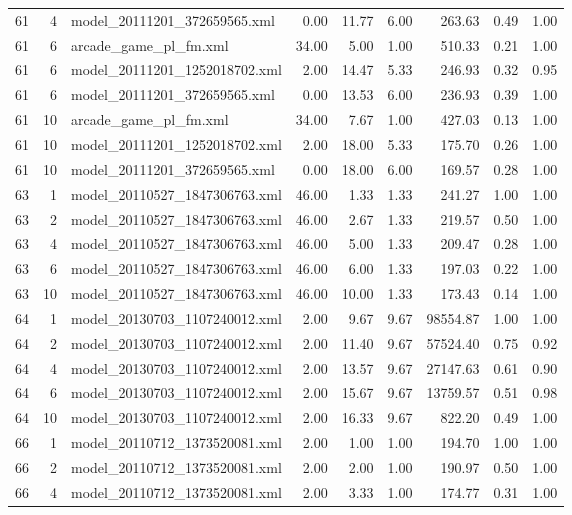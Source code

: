 \begin{table}[ht]
\begin{tabular}{rrlrrrrrr}
   61 &   4 & model\_20111201\_372659565.xml & 0.00 & 11.77 & 6.00 & 263.63 & 0.49 & 1.00 \\ 
   61 &   6 & arcade\_game\_pl\_fm.xml & 34.00 & 5.00 & 1.00 & 510.33 & 0.21 & 1.00 \\ 
   61 &   6 & model\_20111201\_1252018702.xml & 2.00 & 14.47 & 5.33 & 246.93 & 0.32 & 0.95 \\ 
   61 &   6 & model\_20111201\_372659565.xml & 0.00 & 13.53 & 6.00 & 236.93 & 0.39 & 1.00 \\ 
   61 &  10 & arcade\_game\_pl\_fm.xml & 34.00 & 7.67 & 1.00 & 427.03 & 0.13 & 1.00 \\ 
   61 &  10 & model\_20111201\_1252018702.xml & 2.00 & 18.00 & 5.33 & 175.70 & 0.26 & 1.00 \\ 
   61 &  10 & model\_20111201\_372659565.xml & 0.00 & 18.00 & 6.00 & 169.57 & 0.28 & 1.00 \\ 
   63 &   1 & model\_20110527\_1847306763.xml & 46.00 & 1.33 & 1.33 & 241.27 & 1.00 & 1.00 \\ 
   63 &   2 & model\_20110527\_1847306763.xml & 46.00 & 2.67 & 1.33 & 219.57 & 0.50 & 1.00 \\ 
   63 &   4 & model\_20110527\_1847306763.xml & 46.00 & 5.00 & 1.33 & 209.47 & 0.28 & 1.00 \\ 
   63 &   6 & model\_20110527\_1847306763.xml & 46.00 & 6.00 & 1.33 & 197.03 & 0.22 & 1.00 \\ 
   63 &  10 & model\_20110527\_1847306763.xml & 46.00 & 10.00 & 1.33 & 173.43 & 0.14 & 1.00 \\ 
   64 &   1 & model\_20130703\_1107240012.xml & 2.00 & 9.67 & 9.67 & 98554.87 & 1.00 & 1.00 \\ 
   64 &   2 & model\_20130703\_1107240012.xml & 2.00 & 11.40 & 9.67 & 57524.40 & 0.75 & 0.92 \\ 
   64 &   4 & model\_20130703\_1107240012.xml & 2.00 & 13.57 & 9.67 & 27147.63 & 0.61 & 0.90 \\ 
   64 &   6 & model\_20130703\_1107240012.xml & 2.00 & 15.67 & 9.67 & 13759.57 & 0.51 & 0.98 \\ 
   64 &  10 & model\_20130703\_1107240012.xml & 2.00 & 16.33 & 9.67 & 822.20 & 0.49 & 1.00 \\ 
   66 &   1 & model\_20110712\_1373520081.xml & 2.00 & 1.00 & 1.00 & 194.70 & 1.00 & 1.00 \\ 
   66 &   2 & model\_20110712\_1373520081.xml & 2.00 & 2.00 & 1.00 & 190.97 & 0.50 & 1.00 \\ 
   66 &   4 & model\_20110712\_1373520081.xml & 2.00 & 3.33 & 1.00 & 174.77 & 0.31 & 1.00 \\ 

\end{tabular}
\end{table}
